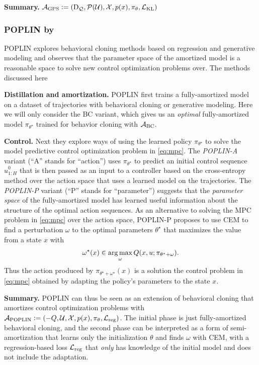 \documentclass[twoside,11pt]{article}
\begin{document}
\textbf{Summary.}
${\mathcal{A}}_{\rm GPS}\vcentcolon= (\mathrm{D}_{\mathcal{Q}}, {\mathcal{P}}({\mathcal{U}}), {\mathcal{X}}, p(x), \pi_\theta, {\mathcal{L}}_{\rm KL})$

\subsubsection{POPLIN by \citet{wang2019exploring}}
POPLIN explores behavioral cloning methods based on regression
and generative modeling and observes that the
parameter space of the amortized model is a reasonable
space to solve new control optimization problems over.
The methods discussed here

\textbf{Distillation and amortization.}
POPLIN first trains a fully-amortized
model on a dataset of trajectories with behavioral cloning
or generative modeling.
Here we will only consider the BC variant, which
gives us an \emph{optimal} fully-amortized
model $\pi_{\theta^\star}$ trained
for behavior cloning with ${\mathcal{A}}_{\rm BC}$.

\textbf{Control.}
Next they explore ways of using the learned policy
$\pi_{\theta^\star}$ to solve the model predictive
control optimization problem in \cref{eq:mpc}.
The \emph{POPLIN-A} variant (``A'' stands for ``action'')
uses $\pi_{\theta^\star}$ to predict an initial
control sequence $\hat u^0_{1:H}$ that is then passed as
an input to a controller based on the cross-entropy method
over the action space that uses a learned model on the trajectories.
The \emph{POPLIN-P} variant (``P'' stands for ``parameter'')
suggests that the \emph{parameter space} of the fully-amortized
model has learned useful information about the structure
of the optimal action sequences.
As an alternative to solving the MPC problem in \cref{eq:mpc}
over the action space,
POPLIN-P proposes to use CEM to find a
perturbation $\omega$ to the optimal parameters $\theta^\star$
that maximizes the value from a state $x$ with
\begin{equation}
  \omega^\star(x) \in \operatorname*{arg\,max}_\omega Q(x, u;
    \pi_{\theta^\star+\omega}).
  \label{eq:POPLIN-P}
\end{equation}
Thus the action produced by
$\pi_{\theta^\star+\omega^\star}(x)$
is a solution the control problem in \cref{eq:mpc}
obtained by adapting the policy's parameters to the
state $x$.

\textbf{Summary.} POPLIN can thus be seen as an extension
of behavioral cloning that amortizes control optimization
problems with
${\mathcal{A}}_{\rm POPLIN}\vcentcolon= (-Q, {\mathcal{U}}, {\mathcal{X}}, p(x), \pi_\theta, {\mathcal{L}}_{\rm reg})$.
The initial phase is just fully-amortized behavioral cloning,
and the second phase can be interpreted as a form of semi-amortization
that learns only the initialization $\theta$ and
finds $\omega$ with CEM, with a regression-based loss ${\mathcal{L}}_{\rm reg}$
that \emph{only} has knowledge of the initial model and does not include
the adaptation.
\end{document}
